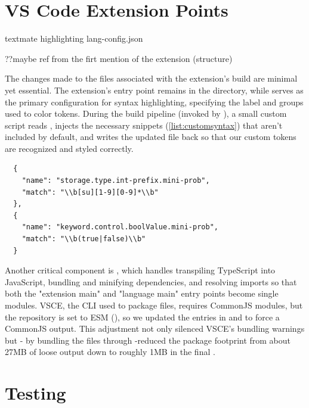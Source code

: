 \section{VS Code Extension Points}
textmate highlighting lang-config.json

??maybe ref from the firt mention of the extension (structure)

The changes made to the files associated with the extension's build are minimal yet essential. The extension's entry point remains  in the
 directory, while  serves as the primary configuration for syntax highlighting, specifying the label and groups used to color tokens.
During the build pipeline (invoked by ), a small custom script reads , injects the necessary snippets (\ref{list:customsyntax})
that aren't included by default, and writes the updated file back so that our custom tokens are recognized and styled correctly.

\begin{verbatim}
  {
    "name": "storage.type.int-prefix.mini-prob",
    "match": "\\b[su][1-9][0-9]*\\b"
  },
  {
    "name": "keyword.control.boolValue.mini-prob",
    "match": "\\b(true|false)\\b"
  }
\end{verbatim}
\label{list:customsyntax}
\vspace{0.5em}

Another critical component is , which handles transpiling TypeScript into JavaScript, bundling and minifying dependencies, and resolving imports so
that both the "extension main" and "language main" entry points become single  modules. VSCE, the CLI used to package  files, requires CommonJS
modules, but the repository is set to ESM (), so we updated the  entries in  and
 to force a CommonJS output. This adjustment not only silenced VSCE's bundling warnings but - by bundling the files through
-reduced the package footprint from about 27MB of loose output down to roughly 1MB in the final .



\section{Testing}

